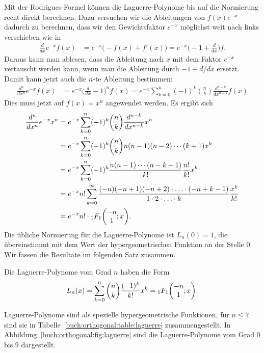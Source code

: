 Mit der Rodrigues-Formel können die Laguerre-Polynome bis auf
die Normierung recht direkt berechnen.
Dazu versuchen wir die Ableitungen von $f(x)e^{-x}$ dadurch zu
berechnen, dass wir den Gewichtsfaktor $e^{-x}$ möglichst weit
nach links verschieben wie in
\begin{align*}
\frac{d}{dx}
e^{-x}
f(x)
&=
e^{-x}
\bigl( -f(x) + f'(x) \bigr)
=
e^{-x}
\biggl( -1 + \frac{d}{dx}\biggr) f.
\end{align*}
Daraus kann man ablesen, dass die Ableitung nach $x$ mit dem Faktor
$e^{-x}$ vertauscht werden kann, wenn man die Ableitung durch
$-1+d/dx$ ersetzt.
Damit kann jetzt auch die $n$-te Ableitung bestimmen:
\begin{align*}
\frac{d^n}{dx^n}e^{-x}f(x)
&=
e^{-x} \biggl(\frac{d}{dx}-1\biggr)^n f(x)
=
e^{-x} \sum_{k=0}^n (-1)^{k}\binom{n}{k}\frac{d^{n-k}}{dx^{n-k}} f(x)
\end{align*}
Dies muss jetzt auf $f(x)=x^n$ angewendet werden.
Es ergibt sich
\begin{align*}
\frac{d^n}{dx^n}e^{-x}x^n
&=
e^{-x} \sum_{k=0}^n (-1)^{k}\binom{n}{k}\frac{d^{n-k}}{dx^{n-k}} x^n
\\
&=
e^{-x} \sum_{k=0}^n (-1)^{k}\binom{n}{k}
n(n-1)(n-2)\cdots (k+1)
x^k
\\
&=
e^{-x}
\sum_{k=0}^n (-1)^k \frac{n(n-1)\cdots(n-k+1)}{k!}
\frac{n!}{k!}
x^k
\\
&=
e^{-x} n!
\sum_{k=0}^\infty
\frac{(-n)(-n+1)(-n+2)\cdot\ldots\cdot (-n+k-1)}{1\cdot 2\cdot \ldots\cdot k}
\frac{x^k}{k!}
\\
&=
e^{-x} n!
\cdot
\mathstrut_1F_1\biggl(
\begin{matrix}-n\\1\end{matrix}; x
\biggr).
\end{align*}
Die übliche Normierung für die Laguerre-Polynome ist $L_n(0)=1$,
die übereinstimmt mit dem Wert der hypergeometrischen Funktion 
an der Stelle $0$.
Wir fassen die Resultate im folgenden Satz zusammen.

\begin{satz}
%
%
Die Laguerre-Polynome vom Grad $n$ haben die Form
\begin{equation}
L_n(x)
=
\sum_{k=0}^n \binom{n}{k}\frac{(-1)^k}{k!}x^k
=
\mathstrut_1F_1\biggl(\begin{matrix}-n\\1\end{matrix};x\biggr).
\label{buch:orthogonal:eqn:laguerre-polynom-hypergeometrisch}
\end{equation}
\end{satz}
Laguerre-Polynome sind als spezielle hypergeometrische Funktionen,
für $n\le 7$ sind sie 
in Tabelle~\ref{buch:orthogonal:table:laguerre} zusammengestellt.
In Abbildung~\ref{buch:orthogonal:fig:laguerre} sind die Laguerre-Polynome
vom Grad $0$ bis $9$ dargestellt.

